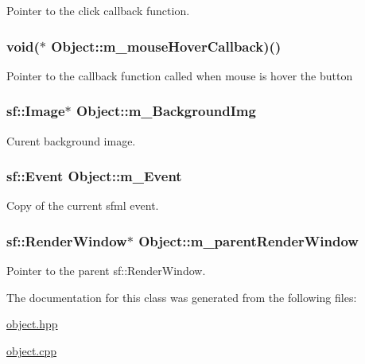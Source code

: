 Pointer to the click callback function. 

\hypertarget{classObject_b26d3ace4076898316d25c7d056ab80f}{
\subsubsection[m\_\-mouseHoverCallback]{\setlength{\rightskip}{0pt plus 5cm}void($\ast$ {\bf Object::m\_\-mouseHoverCallback})()}}
\label{classObject_b26d3ace4076898316d25c7d056ab80f}


Pointer to the callback function called when mouse is hover the button \hypertarget{classObject_e961607134fe49c270e312f3107bf569}{
\subsubsection[m\_\-BackgroundImg]{\setlength{\rightskip}{0pt plus 5cm}sf::Image$\ast$ {\bf Object::m\_\-BackgroundImg}}}
\label{classObject_e961607134fe49c270e312f3107bf569}


Curent background image. 

\hypertarget{classObject_5ded1f794f837d393cf30fc8ecfceb37}{
\subsubsection[m\_\-Event]{\setlength{\rightskip}{0pt plus 5cm}sf::Event {\bf Object::m\_\-Event}}}
\label{classObject_5ded1f794f837d393cf30fc8ecfceb37}


Copy of the current sfml event. 

\hypertarget{classObject_a8afe2c64c045d58821a6af77803c630}{
\subsubsection[m\_\-parentRenderWindow]{\setlength{\rightskip}{0pt plus 5cm}sf::RenderWindow$\ast$ {\bf Object::m\_\-parentRenderWindow}}}
\label{classObject_a8afe2c64c045d58821a6af77803c630}


Pointer to the parent sf::RenderWindow. 



The documentation for this class was generated from the following files:\begin{CompactItemize}
\item 
\hyperlink{object_8hpp}{object.hpp}\item 
\hyperlink{object_8cpp}{object.cpp}\end{CompactItemize}
